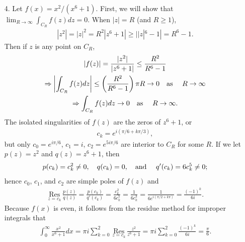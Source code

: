 \documentclass[a4paper,12pt]{article}
\begin{document}
\begin{enumerate}
    \item[4.]
        Let $f(x) = x^2/(x^6 + 1)$. First, we will show that $\lim_{R \to \infty} \int_{C_R} f(z) dz = 0$. When $|z| = R$ (and $R \geq 1$),
        \begin{gather*}
            |z^2| = |z|^2 = R^2
            |z^6 + 1| \geq ||z|^6 - 1| = R^6 - 1.
        \end{gather*}
        Then if $z$ is any point on $C_R$,
        \begin{gather*}
            |f(z)| = \frac{|z^2|}{|z^6 + 1|} \leq \frac{R^2}{R^6 - 1} \\
            \Rightarrow \left| \int_{C_R} f(z) dz \right| \leq \left( \frac{R^2}{R^6 - 1} \right) \pi R \to 0 \text{\quad as \quad} R \to \infty \\
            \Rightarrow \int_{C_R} f(z) dz \to 0 \text{\quad as \quad} R \to \infty.
        \end{gather*}
        The isolated singularities of $f(z)$ are the zeros of $z^6 + 1$, or
        \begin{align*}
            c_k = e^{i(\pi/6 + k\pi/3)},
        \end{align*}
        but only $c_0 = e^{i\pi/6}$, $c_1 = i$, $c_2 = e^{5i\pi/6}$ are interior to $C_R$ for some $R$. If we let $p(z) = z^2$ and $q(z) = z^6 + 1$, then
        \begin{align*}
            p(c_k) = c_k^2 \neq 0, \quad q(c_k) = 0, \text{\quad and \quad} q'(c_k) = 6c_k^5 \neq 0;
        \end{align*}
        hence $c_0$, $c_1$, and $c_2$ are simple poles of $f(z)$ and
        \begin{align*}
            \underset{z = c_k}{\text{\ Res\ }} \frac{p(z)}{q(z)} = \frac{p(c_k)}{q'(c_k)} = \frac{c_k^2}{6c_k^5} = \frac{1}{6c_k^3} = \frac{1}{6e^{i(\pi/2 + k\pi)}} = \frac{(-1)^k}{6i}.
        \end{align*}
        Because $f(x)$ is even, it follows from the residue method for improper integrals that
        \begin{align*}
            \int_0^\infty \frac{x^2}{x^6 + 1} dx = \pi i \sum_{k = 0}^2 \underset{z = c_k}{\text{\ Res\ }} \frac{z^2}{z^6 + 1} = \pi i \sum_{k = 0}^2 \frac{(-1)^k}{6i} = \frac{\pi}{6}.
        \end{align*}


\end{enumerate}
\end{document}
